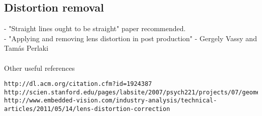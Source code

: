 \subsection{Distortion removal}
- "Straight lines ought to be straight" paper recommended.\\
- "Applying and removing lens distortion in post production" - Gergely Vassy and Tamás Perlaki\\\\
Other useful references\\
\begin{verbatim}
http://dl.acm.org/citation.cfm?id=1924387
http://scien.stanford.edu/pages/labsite/2007/psych221/projects/07/geometric_distortion/project.htm
http://www.embedded-vision.com/industry-analysis/technical-articles/2011/05/14/lens-distortion-correction
\end{verbatim}
